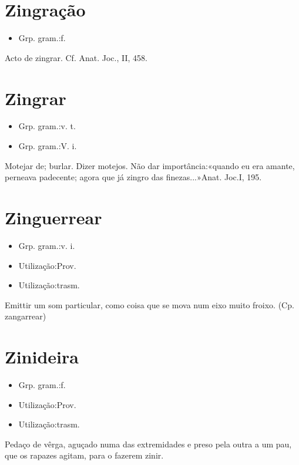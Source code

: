 \section{Zingração}
\begin{itemize}
\item {Grp. gram.:f.}
\end{itemize}
Acto de zingrar. Cf. \textunderscore Anat. Joc.\textunderscore , II, 458.
\section{Zingrar}
\begin{itemize}
\item {Grp. gram.:v. t.}
\end{itemize}
\begin{itemize}
\item {Grp. gram.:V. i.}
\end{itemize}
Motejar de; burlar.
Dizer motejos.
Não dar importância:«\textunderscore quando eu era amante, perneava padecente; agora que já zingro das finezas...\textunderscore »\textunderscore Anat. Joc.\textunderscore  I, 195.
\section{Zinguerrear}
\begin{itemize}
\item {Grp. gram.:v. i.}
\end{itemize}
\begin{itemize}
\item {Utilização:Prov.}
\end{itemize}
\begin{itemize}
\item {Utilização:trasm.}
\end{itemize}
Emittir um som particular, como coisa que se mova num eixo muito froixo.
(Cp. \textunderscore zangarrear\textunderscore )
\section{Zinideira}
\begin{itemize}
\item {Grp. gram.:f.}
\end{itemize}
\begin{itemize}
\item {Utilização:Prov.}
\end{itemize}
\begin{itemize}
\item {Utilização:trasm.}
\end{itemize}
Pedaço de vêrga, aguçado numa das extremidades e preso pela outra a um pau, que os rapazes agitam, para o fazerem zinir.
